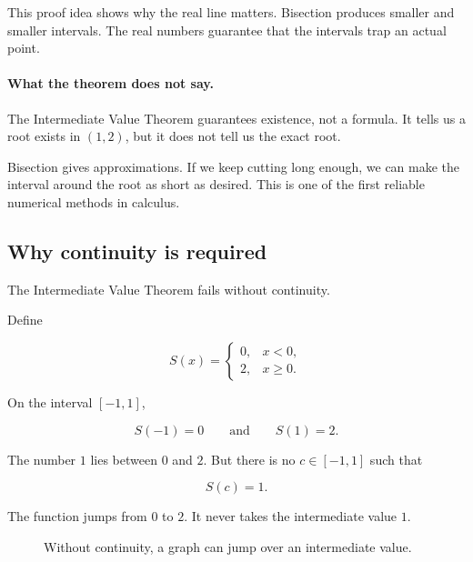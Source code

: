 This proof idea shows why the real line matters.  Bisection produces smaller and smaller intervals.  The real numbers guarantee that the intervals trap an actual point.

\paragraph{What the theorem does not say.}
The Intermediate Value Theorem guarantees existence, not a formula.  It tells us a root exists in \((1,2)\), but it does not tell us the exact root.

Bisection gives approximations.  If we keep cutting long enough, we can make the interval around the root as short as desired.  This is one of the first reliable numerical methods in calculus.

\subsection{Why continuity is required}
\label{subsec:ivt-continuity-required}

The Intermediate Value Theorem fails without continuity.

Define

\[
S(x)=
\begin{cases}
0, & x<0,\\
2, & x\ge0.
\end{cases}
\]

On the interval \([-1,1]\),

\[
S(-1)=0
\qquad\text{and}\qquad
S(1)=2.
\]

The number \(1\) lies between \(0\) and \(2\).  But there is no \(c\in[-1,1]\) such that

\[
S(c)=1.
\]

The function jumps from \(0\) to \(2\).  It never takes the intermediate value \(1\).

\begin{figure}[h]
\centering
{}
\caption{Without continuity, a graph can jump over an intermediate value.}
\label{fig:ivt-fails-jump}
\end{figure}

